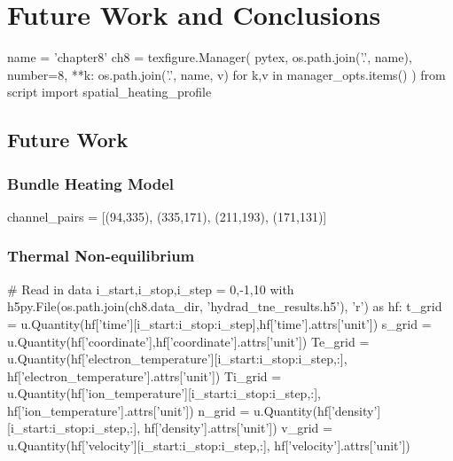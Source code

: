 \chapter{Future Work and Conclusions}\label{ch:conclusions}

\begin{pycode}[chapter8]
name = 'chapter8'
ch8 = texfigure.Manager(
    pytex,
    os.path.join('.', name),
    number=8,
    **{k: os.path.join('.', name, v) for k,v in manager_opts.items()}
)
from script import spatial_heating_profile
\end{pycode}

\section{Future Work}\label{sec:future-work}

\subsection{Bundle Heating Model}\label{sec:bundle}

\begin{pycode}[chapter8]
channel_pairs = [(94,335), (335,171), (211,193), (171,131)]
\end{pycode}

\subsection{Thermal Non-equilibrium}\label{sec:tne}

\begin{pycode}[chapter8]
# Read in data
i_start,i_stop,i_step = 0,-1,10
with h5py.File(os.path.join(ch8.data_dir, 'hydrad_tne_results.h5'), 'r') as hf:
    t_grid = u.Quantity(hf['time'][i_start:i_stop:i_step],hf['time'].attrs['unit'])
    s_grid = u.Quantity(hf['coordinate'],hf['coordinate'].attrs['unit'])
    Te_grid = u.Quantity(hf['electron_temperature'][i_start:i_stop:i_step,:],
                         hf['electron_temperature'].attrs['unit'])
    Ti_grid = u.Quantity(hf['ion_temperature'][i_start:i_stop:i_step,:],
                         hf['ion_temperature'].attrs['unit'])
    n_grid = u.Quantity(hf['density'][i_start:i_stop:i_step,:],
                        hf['density'].attrs['unit'])
    v_grid = u.Quantity(hf['velocity'][i_start:i_stop:i_step,:],
                        hf['velocity'].attrs['unit'])
\end{pycode}

